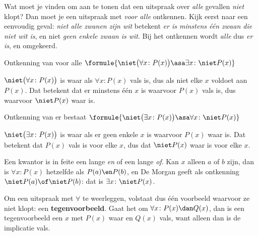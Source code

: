 Wat moet je vinden om aan te tonen dat een uitspraak over \textit{alle} gevallen \textit{niet} klopt? Dan moet je een uitspraak met \textit{voor alle} ontkennen. Kijk eerst naar een eenvoudig geval: \textit{niet alle zwanen zijn wit} betekent \textit{er is minstens één zwaan die niet wit is}, en niet \textit{geen enkele zwaan is wit}. Bij het ontkennen wordt \textit{alle} dus \textit{er is}, en omgekeerd.

\begin{theorie}
\begin{stelling}{Ontkenning van voor alle}
\qquad $\formule{\niet\bigl(\forall x\colon P(x)\bigr) \asa \exists x\colon \niet P(x)}$
\end{stelling}

\begin{bewijs}
$\niet\bigl(\forall x\colon P(x)\bigr)$ is waar als $\forall x\colon P(x)$ vals is, dus als niet elke $x$ voldoet aan $P(x)$. Dat betekent dat er minstens één $x$ is waarvoor $P(x)$ vals is, dus waarvoor $\niet P(x)$ waar is.
\end{bewijs}

\begin{stelling}{Ontkenning van er bestaat}
\qquad $\formule{\niet\bigl(\exists x\colon P(x)\bigr) \asa \forall x\colon \niet P(x)}$
\end{stelling}

\begin{bewijs}
$\niet\bigl(\exists x\colon P(x)\bigr)$ is waar als er geen enkele $x$ is waarvoor $P(x)$ waar is. Dat betekent dat $P(x)$ vals is voor elke $x$, dus dat $\niet P(x)$ waar is voor elke $x$.
\end{bewijs}
\end{theorie}

Een kwantor is in feite een lange \textit{en} of een lange \textit{of}. Kan $x$ alleen $a$ of $b$ zijn, dan is $\forall x\colon P(x)$ hetzelfde als $P(a) \en P(b)$, en De Morgan geeft als ontkenning $\niet P(a) \of \niet P(b)$: dat is $\exists x\colon \niet P(x)$.

Om een uitspraak met $\forall$ te weerleggen, volstaat dus één voorbeeld waarvoor ze niet klopt: een \textbf{tegenvoorbeeld}. Gaat het om $\forall x\colon P(x) \dan Q(x)$, dan is een tegenvoorbeeld een $x$ met $P(x)$ waar en $Q(x)$ vals, want alleen dan is de implicatie vals.


